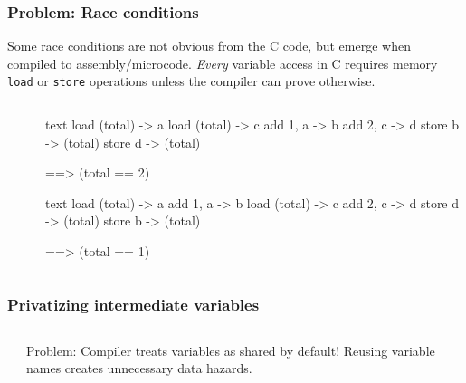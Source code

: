 \documentclass[handout]{beamer}
\begin{document}
\begin{frame}[fragile]
  \frametitle{Problem: Race conditions}
  Some race conditions are not obvious from the C code, but emerge when compiled to assembly/microcode. \emph{Every} variable access in C requires memory \texttt{load} or \texttt{store} operations unless the compiler can prove otherwise. 
  
  \begin{columns}[t]%
    \begin{column}{0.43\textwidth}
    \end{column}

    \begin{column}{0.43\textwidth}
    \end{column}
    
    \begin{column}{0.3\textwidth}
      \begin{ccode}[after skip=4pt]
        {text}
        load (total) -> a
          load (total) -> c
        add 1, a -> b
          add 2, c -> d
        store b -> (total)
          store d -> (total)

          ==> (total == 2)\end{ccode}
      \begin{ccode}[]
        {text}
        load (total) -> a
        add 1, a -> b
          load (total) -> c
          add 2, c -> d
          store d -> (total)
        store b -> (total)
        
          ==> (total == 1)\end{ccode}
    \end{column}
  \end{columns}
\end{frame}


\begin{frame}[fragile]
  \frametitle{Privatizing intermediate variables}
  \begin{columns}[t]%
    \begin{column}{0.6\textwidth}
    \end{column}

    \pause
    \begin{column}{0.4\textwidth}
      Problem: Compiler treats variables as shared by default! Reusing variable names creates unnecessary data hazards.
    \end{column}
  \end{columns}
\end{frame}
\end{document}
